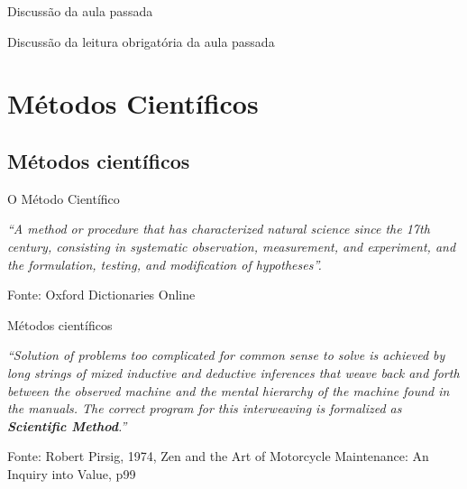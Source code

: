 \documentclass{beamer}
\begin{document}

\begin{frame}{Discussão da aula passada}
  \begin{block}{}
    Discussão da leitura obrigatória da aula passada
  \end{block}
\end{frame}

\section{Métodos Científicos}

\subsection{Métodos científicos}


\begin{frame}{O Método Científico}
  \begin{block}{}
    \footnotesize
    {\em ``A method or procedure that has characterized natural science since the 17th century, consisting in systematic observation, measurement, and experiment, and the formulation, testing, and modification of hypotheses''.}
  \end{block}

  \vfill
  \tiny
  \hfill Fonte: Oxford Dictionaries Online
\end{frame}

\begin{frame}{Métodos científicos}
  \begin{block}{}
    \footnotesize
    {\em ``Solution of problems too complicated for common sense to solve
    is achieved by long strings of mixed \alert{inductive} and
    \alert{deductive} inferences that weave back and forth between the
    observed machine and the mental hierarchy of the machine found in
    the manuals. The correct program for this interweaving is
    formalized as {\bf Scientific Method}.''}
  \end{block}

  \vfill
  \tiny
  \hfill Fonte: Robert Pirsig, 1974, Zen and the Art of Motorcycle
  Maintenance: An Inquiry into Value, p99
\end{frame}
\end{document}
